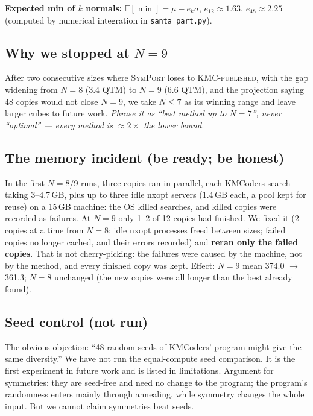 \documentclass[10.5pt,a4paper]{article}
\newcommand{\M}[1]{\textsc{#1}}
\begin{document}
\textbf{Expected min of $k$ normals:} $\mathbb{E}[\min]=\mu - e_k\sigma$, $e_{12}\approx1.63$, $e_{48}\approx2.25$ (computed by
numerical integration in \texttt{santa\_part.py}).

\subsection{Why we stopped at $N=9$}
After two consecutive sizes where \M{SymPort} loses to \M{KMC-published}, with the gap widening from $N=8$ (3.4 QTM) to $N=9$
(6.6 QTM), and the projection saying 48 copies would not close $N=9$, we take $N\le7$ as its winning range and leave larger cubes to
future work. \emph{Phrase it as ``best method up to $N=7$'', never ``optimal'' --- every method is $\approx2\times$ the lower bound.}

\subsection{The memory incident (be ready; be honest)}
In the first $N=8$/9 runs, three copies ran in parallel, each KMCoders search taking 3--4.7\,GB, plus up to three idle nxopt
servers (1.4\,GB each, a pool kept for reuse) on a 15\,GB machine: the OS killed searches, and killed copies were recorded as
failures. At $N=9$ only 1--2 of 12 copies had finished. We fixed it (2 copies at a time from $N=8$; idle nxopt processes freed between
sizes; failed copies no longer cached, and their errors recorded) and \textbf{reran only the failed copies}. That is not
cherry-picking: the failures were caused by the machine, not by the method, and every finished copy was kept. Effect: $N=9$ mean
374.0 $\to$ 361.3; $N=8$ unchanged (the new copies were all longer than the best already found).

\subsection{Seed control (not run)}
The obvious objection: ``48 random seeds of KMCoders' program might give the same diversity.'' We have not run the equal-compute
seed comparison. It is the first experiment in future work and is listed in limitations. Argument for symmetries: they are
seed-free and need no change to the program; the program's randomness enters mainly through annealing, while symmetry changes the
whole input. But we cannot claim symmetries beat seeds.

\end{document}
